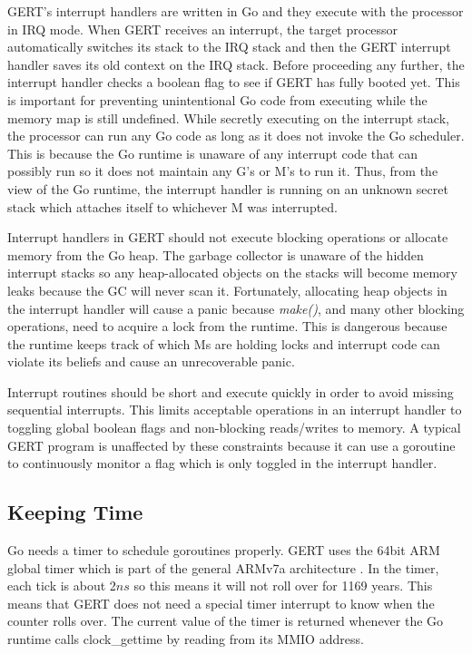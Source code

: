 GERT's interrupt handlers are written in Go and they execute with the processor
in IRQ mode. When GERT receives an interrupt, the target processor
automatically switches its stack to the IRQ stack and then the GERT interrupt handler saves its old context on the IRQ stack.
Before proceeding any further, the interrupt handler checks a boolean flag to see if GERT has fully booted yet. This is important
for preventing unintentional Go code from executing while the memory map is still undefined.
While secretly executing on the interrupt stack, the processor can run any Go code
as long as it does not invoke the Go scheduler. This is because the Go runtime is unaware
of any interrupt code that can possibly run so it does not maintain any G's or M's to
run it. Thus, from the view of the Go runtime, the interrupt handler is running on an unknown secret stack which attaches itself
to whichever M was interrupted.

Interrupt handlers in GERT should not execute blocking operations or allocate memory from the Go heap.
The garbage collector is unaware of the hidden interrupt stacks so any heap-allocated objects on the stacks
will become memory leaks because the GC will never scan it. Fortunately, allocating heap objects in the interrupt
handler will cause a panic because \textit{make()}, and many other blocking operations, need to acquire
a lock from the runtime. This is dangerous because the runtime keeps track of which Ms are holding locks
and interrupt code can violate its beliefs and cause an unrecoverable panic.

Interrupt
routines should be short and execute quickly in order to avoid missing sequential
interrupts. This limits acceptable operations in an interrupt handler to toggling global boolean
flags and non-blocking reads/writes to memory. A typical GERT program is unaffected by these constraints
because it can use a goroutine to continuously monitor a flag which is only toggled in the interrupt handler.

\subsection{Keeping Time}

Go needs a timer to schedule goroutines properly. GERT uses the 64bit ARM global timer which
is part of the general ARMv7a architecture \cite{ddi0406}. In the timer, each tick is about 2$ns$ so this means it will
not roll over for 1169 years. This means that GERT does not need a special timer interrupt to know when the
counter rolls over. The current value of the timer is returned whenever the Go runtime calls
clock\_gettime by reading from its MMIO address.

